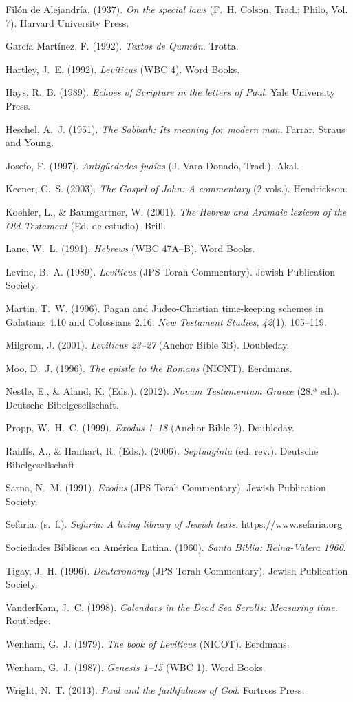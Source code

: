 \documentclass[11pt,letterpaper]{article}
\newcommand{\refapa}[1]{\par{\RaggedRight\hangindent=1.27cm\hangafter=1\noindent #1\par}\vspace{4pt}}
\begin{document}
\refapa{Filón de Alejandría. (1937). \emph{On the special laws} (F.~H. Colson, Trad.; Philo, Vol. 7). Harvard University Press.}
\refapa{García Martínez, F. (1992). \emph{Textos de Qumrán}. Trotta.}
\refapa{Hartley, J.~E. (1992). \emph{Leviticus} (WBC 4). Word Books.}
\refapa{Hays, R.~B. (1989). \emph{Echoes of Scripture in the letters of Paul}. Yale University Press.}
\refapa{Heschel, A.~J. (1951). \emph{The Sabbath: Its meaning for modern man}. Farrar, Straus and Young.}
\refapa{Josefo, F. (1997). \emph{Antigüedades judías} (J. Vara Donado, Trad.). Akal.}
\refapa{Keener, C.~S. (2003). \emph{The Gospel of John: A commentary} (2 vols.). Hendrickson.}
\refapa{Koehler, L., \& Baumgartner, W. (2001). \emph{The Hebrew and Aramaic lexicon of the Old Testament} (Ed. de estudio). Brill.}
\refapa{Lane, W.~L. (1991). \emph{Hebrews} (WBC 47A--B). Word Books.}
\refapa{Levine, B.~A. (1989). \emph{Leviticus} (JPS Torah Commentary). Jewish Publication Society.}
\refapa{Martin, T.~W. (1996). Pagan and Judeo-Christian time-keeping schemes in Galatians 4.10 and Colossians 2.16. \emph{New Testament Studies}, \emph{42}(1), 105--119.}
\refapa{Milgrom, J. (2001). \emph{Leviticus 23--27} (Anchor Bible 3B). Doubleday.}
\refapa{Moo, D.~J. (1996). \emph{The epistle to the Romans} (NICNT). Eerdmans.}
\refapa{Nestle, E., \& Aland, K. (Eds.). (2012). \emph{Novum Testamentum Graece} (28.ª ed.). Deutsche Bibelgesellschaft.}
\refapa{Propp, W.~H.~C. (1999). \emph{Exodus 1--18} (Anchor Bible 2). Doubleday.}
\refapa{Rahlfs, A., \& Hanhart, R. (Eds.). (2006). \emph{Septuaginta} (ed. rev.). Deutsche Bibelgesellschaft.}
\refapa{Sarna, N.~M. (1991). \emph{Exodus} (JPS Torah Commentary). Jewish Publication Society.}
\refapa{Sefaria. (s.~f.). \emph{Sefaria: A living library of Jewish texts}. https://www.sefaria.org}
\refapa{Sociedades Bíblicas en América Latina. (1960). \emph{Santa Biblia: Reina-Valera 1960}.}
\refapa{Tigay, J.~H. (1996). \emph{Deuteronomy} (JPS Torah Commentary). Jewish Publication Society.}
\refapa{VanderKam, J.~C. (1998). \emph{Calendars in the Dead Sea Scrolls: Measuring time}. Routledge.}
\refapa{Wenham, G.~J. (1979). \emph{The book of Leviticus} (NICOT). Eerdmans.}
\refapa{Wenham, G.~J. (1987). \emph{Genesis 1--15} (WBC 1). Word Books.}
\refapa{Wright, N.~T. (2013). \emph{Paul and the faithfulness of God}. Fortress Press.}
\end{document}
